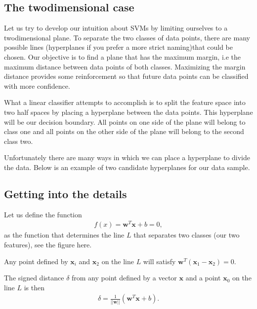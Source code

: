 \documentclass[letterpaper,10pt,english]{sphinxmanual}
\begin{document}
\subsection{The two\sphinxhyphen{}dimensional case}
\label{\detokenize{chapter7:the-two-dimensional-case}}
Let us try to develop our intuition about SVMs by limiting ourselves to a two\sphinxhyphen{}dimensional
plane.  To separate the two classes of data points, there are many
possible lines (hyperplanes if you prefer a more strict naming)that could be chosen. Our objective is to find a
plane that has the maximum margin, i.e the maximum distance between
data points of both classes. Maximizing the margin distance provides
some reinforcement so that future data points can be classified with
more confidence.

What a linear classifier attempts to accomplish is to split the
feature space into two half spaces by placing a hyperplane between the
data points.  This hyperplane will be our decision boundary.  All
points on one side of the plane will belong to class one and all points
on the other side of the plane will belong to the second class two.

Unfortunately there are many ways in which we can place a hyperplane
to divide the data.  Below is an example of two candidate hyperplanes
for our data sample.


\subsection{Getting into the details}
\label{\detokenize{chapter7:getting-into-the-details}}
Let us define the function
\begin{equation*}
\begin{split}
f(x) = \boldsymbol{w}^T\boldsymbol{x}+b = 0,
\end{split}
\end{equation*}
as the function that determines the line \(L\) that separates two classes (our two features), see the figure here.

Any point defined by \(\boldsymbol{x}_i\) and \(\boldsymbol{x}_2\) on the line \(L\) will satisfy \(\boldsymbol{w}^T(\boldsymbol{x}_1-\boldsymbol{x}_2)=0\).

The signed distance \(\delta\) from any point defined by a vector \(\boldsymbol{x}\) and a point \(\boldsymbol{x}_0\) on the line \(L\) is then
\begin{equation*}
\begin{split}
\delta = \frac{1}{\vert\vert \boldsymbol{w}\vert\vert}(\boldsymbol{w}^T\boldsymbol{x}+b).
\end{split}
\end{equation*}
\end{document}
